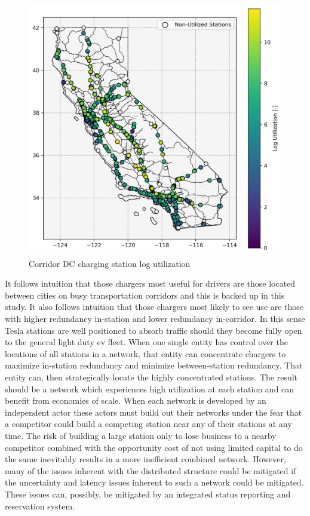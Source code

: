 \begin{multicols}{2}
\begin{figure}[H]
	\centering
	\includegraphics[width = \linewidth]{figs/California_SNG_Utilization.png}
	\caption{Corridor DC charging station log utilization}
	\label{fig:utilized_stations}
\end{figure}

It follows intuition that those chargers most useful for drivers are those located between cities on busy transportation corridors and this is backed up in this study. It also follows intuition that those chargers most likely to see use are those with higher redundancy in-station and lower redundancy in-corridor. In this sense Tesla stations are well positioned to absorb traffic should they become fully open to the general light duty \gls{ev} fleet. When one single entity has control over the locations of all stations in a network, that entity can concentrate chargers to maximize in-station redundancy and minimize between-station redundancy. That entity can, then strategically locate the highly concentrated stations. The result should be a network which experiences high utilization at each station and can benefit from economies of scale. When each network is developed by an independent actor these actors must build out their networks under the fear that a competitor could build a competing station near any of their stations at any time. The risk of building a large station only to lose business to a nearby competitor combined with the opportunity cost of not using limited capital to do the same inevitably results in a more inefficient combined network. However, many of the issues inherent with the distributed structure could be mitigated if the uncertainty and latency issues inherent to such a network could be mitigated. These issues can, possibly, be mitigated by an integrated status reporting and reservation system.



\end{multicols}
